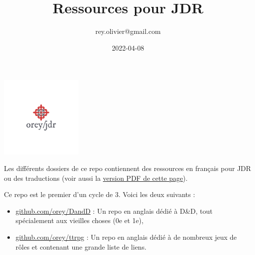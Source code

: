 \documentclass[a4paper, 11pt, twoside]{article}
\author{rey.olivier@gmail.com}
\date{2022-04-08}
\title{Ressources pour JDR}
\begin{document}
\maketitle
\tableofcontents

\begin{center}
\includegraphics[width=4cm]{logo-orey.png}
\end{center}

Les différents dossiers de ce repo contiennent des ressources en français pour JDR ou des traductions (voir aussi la \href{RessourcesPourJDR-ORey.pdf}{version PDF de cette page}).

Ce repo est le premier d'un cycle de 3. Voici les deux suivants :
\begin{itemize}
\item \href{https://github.com/orey/DandD}{github.com/orey/DandD} : Un repo en anglais dédié à D\&D, tout spécialement aux vieilles choses (0e et 1e),
\item \href{https://github.com/orey/ttrpg}{github.com/orey/ttrpg} : Un repo en anglais dédié à de nombreux jeux de rôles et contenant une grande liste de liens.
\end{itemize}
\end{document}
